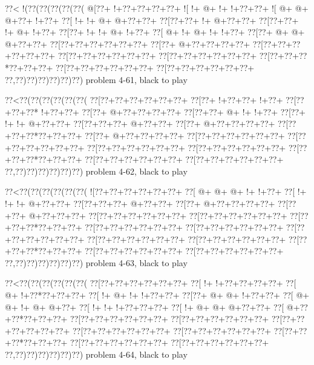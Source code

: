 \vbox{\vbox{\goo
\0??<\- !(\0??(\0??(\0??(\0??(\0??(
\- @[\0??+\- !+\0??+\0??+\0??+\0??+
\- ![\- !+\- @+\- !+\- !+\0??+\0??+
\- ![\- @+\- @+\- @+\0??+\- !+\0??+
\0??[\- !+\- !+\- @+\- @+\0??+\0??+
\0??[\0??+\0??+\- !+\- @+\0??+\0??+
\0??[\0??+\0??+\- !+\- @+\- !+\0??+
\0??[\0??+\- !+\- !+\- @+\- !+\0??+
\0??[\- @+\- !+\- @+\- !+\- !+\0??+
\0??[\0??+\- @+\- @+\- @+\0??+\0??+
\0??[\0??+\0??+\0??+\0??+\0??+\0??+
\0??[\0??+\- @+\0??+\0??+\0??+\0??+
\0??[\0??+\0??+\0??+\0??+\0??+\0??+
\0??[\0??+\0??+\0??+\0??+\0??+\0??+
\0??[\0??+\0??+\0??+\0??+\0??+\0??+
\0??[\0??+\0??+\0??*\0??+\0??+\0??+
\0??[\0??+\0??+\0??+\0??+\0??+\0??+
\0??[\0??+\0??+\0??+\0??+\0??+\0??+
\0??,\0??)\0??)\0??)\0??)\0??)\0??)
}
\hfil problem 4-61, black to play\hfil\break
}

\vbox{\vbox{\goo
\0??<\0??(\0??(\0??(\0??(\0??(\0??(
\0??[\0??+\0??+\0??+\0??+\0??+\0??+
\0??[\0??+\- !+\0??+\0??+\- !+\0??+
\0??[\0??+\0??+\0??*\- !+\0??+\0??+
\0??[\0??+\- @+\0??+\0??+\0??+\0??+
\0??[\0??+\0??+\- @+\- !+\- !+\0??+
\0??[\0??+\- !+\- !+\- @+\0??+\0??+
\0??[\0??+\0??+\0??+\- @+\0??+\0??+
\0??[\0??+\- @+\0??+\0??+\0??+\0??+
\0??[\0??+\0??+\0??*\0??+\0??+\0??+
\0??[\0??+\- @+\0??+\0??+\0??+\0??+
\0??[\0??+\0??+\0??+\0??+\0??+\0??+
\0??[\0??+\0??+\0??+\0??+\0??+\0??+
\0??[\0??+\0??+\0??+\0??+\0??+\0??+
\0??[\0??+\0??+\0??+\0??+\0??+\0??+
\0??[\0??+\0??+\0??*\0??+\0??+\0??+
\0??[\0??+\0??+\0??+\0??+\0??+\0??+
\0??[\0??+\0??+\0??+\0??+\0??+\0??+
\0??,\0??)\0??)\0??)\0??)\0??)\0??)
}
\hfil problem 4-62, black to play\hfil\break
}

\vbox{\vbox{\goo
\0??<\0??(\0??(\0??(\0??(\0??(\0??(
\- ![\0??+\0??+\0??+\0??+\0??+\0??+
\0??[\- @+\- @+\- @+\- !+\- !+\0??+
\0??[\- !+\- !+\- !+\- @+\0??+\0??+
\0??[\0??+\0??+\0??+\- @+\0??+\0??+
\0??[\0??+\- @+\0??+\0??+\0??+\0??+
\0??[\0??+\0??+\- @+\0??+\0??+\0??+
\0??[\0??+\0??+\0??+\0??+\0??+\0??+
\0??[\0??+\0??+\0??+\0??+\0??+\0??+
\0??[\0??+\0??+\0??*\0??+\0??+\0??+
\0??[\0??+\0??+\0??+\0??+\0??+\0??+
\0??[\0??+\0??+\0??+\0??+\0??+\0??+
\0??[\0??+\0??+\0??+\0??+\0??+\0??+
\0??[\0??+\0??+\0??+\0??+\0??+\0??+
\0??[\0??+\0??+\0??+\0??+\0??+\0??+
\0??[\0??+\0??+\0??*\0??+\0??+\0??+
\0??[\0??+\0??+\0??+\0??+\0??+\0??+
\0??[\0??+\0??+\0??+\0??+\0??+\0??+
\0??,\0??)\0??)\0??)\0??)\0??)\0??)
}
\hfil problem 4-63, black to play\hfil\break
}

\vbox{\vbox{\goo
\0??<\0??(\0??(\0??(\0??(\0??(\0??(
\0??[\0??+\0??+\0??+\0??+\0??+\0??+
\0??[\- !+\- !+\0??+\0??+\0??+\0??+
\0??[\- @+\- !+\0??*\0??+\0??+\0??+
\0??[\- !+\- @+\- !+\- !+\0??+\0??+
\0??[\0??+\- @+\- @+\- !+\0??+\0??+
\0??[\- @+\- @+\- !+\- @+\- @+\0??+
\0??[\- !+\- !+\- !+\0??+\0??+\0??+
\0??[\- !+\- @+\- @+\- @+\0??+\0??+
\0??[\- @+\0??+\0??*\0??+\0??+\0??+
\0??[\0??+\0??+\0??+\0??+\0??+\0??+
\0??[\0??+\0??+\0??+\0??+\0??+\0??+
\0??[\0??+\0??+\0??+\0??+\0??+\0??+
\0??[\0??+\0??+\0??+\0??+\0??+\0??+
\0??[\0??+\0??+\0??+\0??+\0??+\0??+
\0??[\0??+\0??+\0??*\0??+\0??+\0??+
\0??[\0??+\0??+\0??+\0??+\0??+\0??+
\0??[\0??+\0??+\0??+\0??+\0??+\0??+
\0??,\0??)\0??)\0??)\0??)\0??)\0??)
}
\hfil problem 4-64, black to play\hfil\break
}

